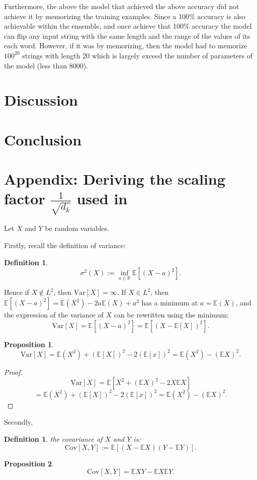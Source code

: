 \documentclass{article}
\theoremstyle{plain}
\theoremstyle{plain} %
\newtheorem{proposition}{Proposition}
\newtheorem{definition}[theorem]{Definition}
\theoremstyle{definition}  %
\theoremstyle{remark}  %
\theoremstyle{plain}
\begin{document}
Furthermore, the above the model that achieved the above accuracy did not achieve it by memorizing the training examples. Since a 100\% accuracy is also achievable within the ensemble, and once achieve that 100\% accuracy the model can flip any input string with the same length and the range of the values of its each word. However, if it was by memorizing, then the model had to memorize $100^20$ strings with length 20 which is largely exceed the number of parameters of the model (less than 8000).

\section{Discussion}
\section{Conclusion}

\section{Appendix: Deriving the scaling factor $\frac{1}{\sqrt{d_k}}$ used in \cite{vaswani2017attention}}

Let $X$ and $Y$ be random variables.

Firstly, recall the definition of variance\cite{folland1999real}:
\begin{definition}
$$
\sigma^2(X):=\inf\limits_{a\in\mathbb{R}}\mathbb{E}\left[\left(X-a \right)^2 \right].
$$
\end{definition}
Hence if $X\notin L^2$, then $\text{Var}[X]=\infty$. If $X\in L^2$, then $\mathbb{E}\left[\left(X-a \right)^2 \right]=\mathbb{E}(X^2)-2a\mathbb{E}(X)+a^2$ has a minimum at $a=\mathbb{E}(X)$, and the expression of the variance of $X$ can be rewritten using the minimum:
$$
\text{Var}[X]=\mathbb{E}\left[\left(X-a \right)^2 \right]=\mathbb{E}\left[\left(X- \mathbb{E}[X]\right)^2 \right].
$$
\begin{proposition}
$$
\text{Var}[X]=\mathbb{E}(X^2)+(\mathbb{E}[X])^2-2(\mathbb{E}[x])^2=\mathbb{E}(X^2)-(\mathbb{E}X)^2.
$$
\end{proposition}
\begin{proof}
$$
\text{Var}[X]=\mathbb{E}\left[X^2+\left( \mathbb{E} X\right)^2 -2X\mathbb{E}X\right]
$$
$$
=\mathbb{E}(X^2)+(\mathbb{E}[X])^2-2(\mathbb{E}[x])^2=\mathbb{E}(X^2)-(\mathbb{E}X)^2.
$$
\end{proof}
Secondly, 
\begin{definition}
the covariance of $X$ and $Y$ is:
$$
\text{Cov}[X,Y]:=\mathbb{E}\left[(X-\mathbb{E} X)(Y-\mathbb{E} Y) \right].
$$
\end{definition}
\begin{proposition}
$$
\text{Cov}[X,Y]=\mathbb{E}XY-\mathbb{E}X\mathbb{E}Y.
$$
\end{proposition}
\end{document}
